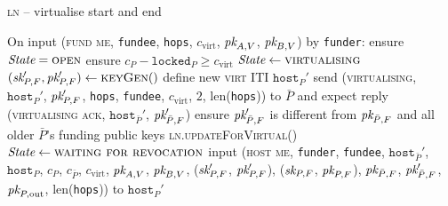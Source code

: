 \begin{center}
  \begin{processbox}{\textsc{ln} -- virtualise start and end}
    \begin{algorithmic}[1]
      \State On input (\textsc{fund me}, \texttt{fundee}, \texttt{hops},
      $c_{\mathrm{virt}}$, $\textit{pk}_{A, V}$, $\textit{pk}_{B, V}$) by \texttt{funder}:
      \Indent
        \State ensure $\itistate = \textsc{open}$
        \State ensure $c_P - \texttt{locked}_P \geq c_{\mathrm{virt}}$
        \State $\itistate \gets \textsc{virtualising}$
        \State $(\textit{sk}_{P, F}', \textit{pk}_{P, F}') \gets \textsc{keyGen}()$
        \State define new \textsc{virt} ITI $\texttt{host}_P'$
        \label{code:ln:virtualise:start-end:define}
        \State send (\textsc{virtualising}, $\texttt{host}_P'$, $\textit{pk}_{P, F}'$,
        \texttt{hops}, \texttt{fundee}, $c_{\mathrm{virt}}$, $2$,
        len(\texttt{hops})) to $\bar{P}$ and expect reply (\textsc{virtualising
        ack}, $\texttt{host}_{\bar{P}}'$, $\textit{pk}_{\bar{P}, F}'$)
        \State ensure $\textit{pk}_{\bar{P}, F}'$ is different from $\textit{pk}_{\bar{P}, F}$ and
        all older $\bar{P}$'s funding public keys
        \State \textsc{ln}.\textsc{updateForVirtual}()
        \label{code:ln:virtualise:start-end:virtual-update}
        \State $\itistate \gets \textsc{waiting for revocation}$
        \State input (\textsc{host me}, \texttt{funder}, \texttt{fundee},
        $\texttt{host}_{\bar{P}}'$, $\texttt{host}_P$, $c_P$, $c_{\bar{P}}$,
        $c_{\mathrm{virt}}$, $\textit{pk}_{A, V}$, $\textit{pk}_{B, V}$, ($\textit{sk}_{P, F}'$, $\textit{pk}_{P,
        F}'$), ($\textit{sk}_{P, F}$, $\textit{pk}_{P, F}$), $\textit{pk}_{\bar{P}, F}$, $\textit{pk}_{\bar{P},
        F}'$, $\textit{pk}_{P, \mathrm{out}}$, len(\texttt{hops})) to $\texttt{host}_P'$
        \label{code:ln:virtualise:start-end:host-me}
      \EndIndent
      \Statex


\end{algorithmic}
\end{processbox}
\end{center}
